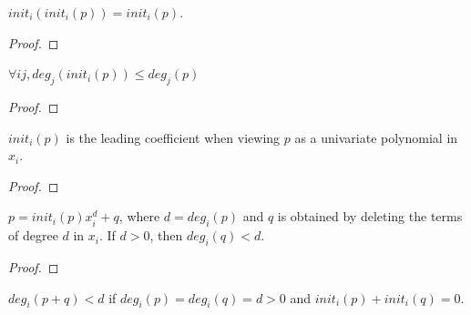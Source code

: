 \begin{lemma}
    \label{lem:initialOf_initialOf_self}
    \leanok
    $init_i(init_i(p)) = init_i(p)$.
\end{lemma}

\begin{proof}
    \leanok
\end{proof}

\begin{lemma}
    \label{lem:degreeOf_initialOf_le}
    \leanok
    $\forall i j, deg_j(init_i(p)) \le deg_j(p)$
\end{lemma}

\begin{proof}
    \leanok
\end{proof}

\begin{theorem}
    \label{thm:initialOf_eq_leadingCoeff}
    \leanok
    $init_i(p)$ is the leading coefficient when viewing $p$ as a univariate polynomial in $x_i$.
\end{theorem}

\begin{proof}
    \leanok
\end{proof}

\begin{theorem}
    \label{thm:initialOf_mul_X_pow_add_eraseInitOf}
    \leanok
    $p = init_i(p) x_i ^ d + q$, where $d = deg_i(p)$ and $q$ is obtained by deleting the terms of degree $d$ in $x_i$.
    If $d > 0$, then $deg_i(q) < d$.
\end{theorem}

\begin{proof}
    \leanok
\end{proof}

\begin{lemma}
    \label{lem:degreeOf_add_lt_of_initialOf_cancel}
    \leanok
    $deg_i(p + q) < d$ if $deg_i(p) = deg_i(q) = d > 0$ and $init_i(p) + init_i(q) = 0$.
\end{lemma}

